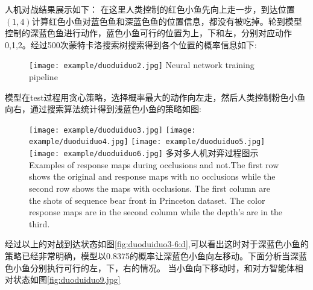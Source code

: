 人机对战结果展示如下：
在这里人类控制的红色小鱼先向上走一步，到达位置$(1,4)$计算红色小鱼对蓝色鱼和深蓝色鱼的位置信息，都没有被吃掉。轮到模型控制的深蓝色鱼进行动作，蓝色小鱼可行的位置为上，下和左，分别对应动作0,1,2。经过500次蒙特卡洛搜索树搜索得到各个位置的概率信息如下:
\begin{figure}[!htp]
	\centering
	\texttt{[image: example/duoduiduo2.jpg]}
	{Neural network training pipeline}
	\label{duoduiduo2.png}
\end{figure}
模型在test过程用贪心策略，选择概率最大的动作向左走，然后人类控制粉色小鱼向右，通过搜索算法统计得到浅蓝色小鱼的策略如图:

\begin{figure}[!htp]
	\centering
	\subcaptionbox{\label{fig2:fig:duoduiduo3-6:a}}
	{\texttt{[image: example/duoduiduo3.jpg]}}
	\hspace{0.5em}
	\subcaptionbox{\label{fig:duoduiduo3-6:b}}
	{\texttt{[image: example/duoduiduo4.jpg]}}
	\newline
	\centering
	\subcaptionbox{\label{fig:duoduiduo3-6:c}}
	{\texttt{[image: example/duoduiduo5.jpg]}}
	\hspace{0.5em}
	\subcaptionbox{\label{fig:duoduiduo3-6:d}}
	{\texttt{[image: example/duoduiduo6.jpg]}}
	\bicaption
	{多对多人机对弈过程图示}
	{Examples of response maps during occlusions and not.The first row shows the original and response maps with no occlusions while the second row shows the maps with occlusions. The first column are the shots of sequence bear front in Princeton dataset. The color response maps are in the second column while the depth’s are in the third.}
	\label{fig:duoduiduo3-6}
\end{figure}

经过以上的对战到达状态如图\ref{fig:duoduiduo3-6:d},可以看出这时对于深蓝色小鱼的策略已经非常明确，模型以0.8375的概率让深蓝色小鱼向左移动。下面分析当深蓝色小鱼分别执行可行的左，下，右的情况。
当小鱼向下移动时，和对方智能体相对状态如图\ref{fig:duoduiduo9.jpg}



